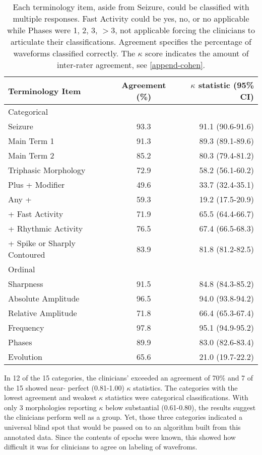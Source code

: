 \begin{table}[ht]
\caption[EEG Terminology Agreement]{Each terminology item, aside from Seizure, could be classified with multiple responses. Fast Activity could be yes, no, or no applicable while Phases were 1, 2, 3, $>$3, not applicable forcing the clinicians to articulate their classifications. Agreement specifies the percentage of waveforms classified correctly. The $\kappa$ score indicates the amount of inter-rater agreement, see \ref{append-cohen}.}
\centering
\begin{tabular}{l c r}
\toprule
Terminology Item & Agreement (\%) & \makecell{$\kappa$ statistic\\(95\% CI)} \\
\midrule
Categorical					&	&	\\
Seizure 						& 93.3 & 91.1 (90.6-91.6) \\
Main Term 1 					& 91.3 & 89.3 (89.1-89.6) \\
Main Term 2 					& 85.2 & 80.3 (79.4-81.2) \\
Triphasic Morphology 			& 72.9 & 58.2 (56.1-60.2) \\
Plus + Modifier 				& 49.6 & 33.7 (32.4-35.1) \\
Any +	 					& 59.3 & 19.2 (17.5-20.9) \\
+ Fast Activity 				& 71.9 & 65.5 (64.4-66.7) \\
+ Rhythmic Activity 			& 76.5 & 67.4 (66.5-68.3) \\
+ Spike or Sharply Contoured & 83.9 & 81.8 (81.2-82.5) \\
\midrule
Ordinal						&	&	\\
Sharpness 					& 91.5 & 84.8 (84.3-85.2) \\
Absolute Amplitude 			& 96.5 & 94.0 (93.8-94.2) \\
Relative Amplitude 			& 71.8 & 66.4 (65.3-67.4) \\
Frequency 					& 97.8 & 95.1 (94.9-95.2) \\
Phases 						& 89.9 & 83.0 (82.6-83.4) \\
Evolution 					& 65.6 & 21.0 (19.7-22.2) \\
\bottomrule
\end{tabular}
\label{tab:gaspard}
\end{table}

In 12 of the 15 categories, the clinicians' exceeded an agreement of 70\% and 7 of the 15 showed near- perfect (0.81-1.00) $\kappa$ statistics. The categories with the lowest agreement and weakest $\kappa$ statistics were categorical classifications. With only 3 morphologies reporting $\kappa$ below substantial (0.61-0.80), the results suggest the clinicians perform well as a group. Yet, those three categories indicated a universal blind spot that would be passed on to an algorithm built from this annotated data. Since the contents of epochs were known, this showed how difficult it was for clinicians to agree on labeling of wavefroms.

